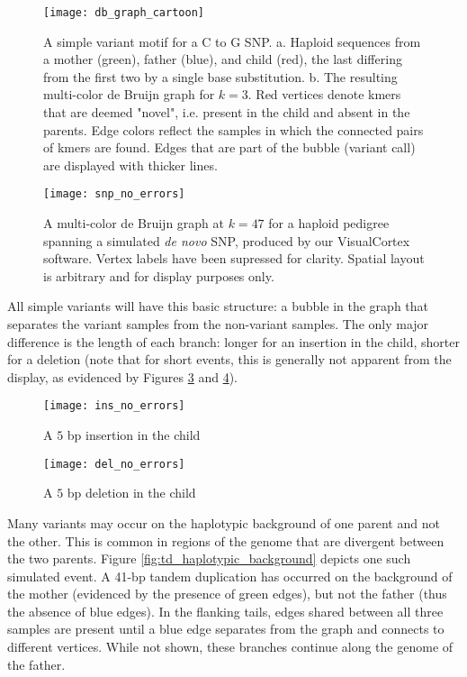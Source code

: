 \begin{figure}[h!]
  \centering
    \texttt{[image: db\_graph\_cartoon]}
  \caption{A simple variant motif for a C to G SNP.  a. Haploid sequences from a mother (green), father (blue), and child (red), the last differing from the first two by a single base substitution.  b. The resulting multi-color de Bruijn graph for $k=3$.  Red vertices denote kmers that are deemed "novel", i.e. present in the child and absent in the parents. Edge colors reflect the samples in which the connected pairs of kmers are found. Edges that are part of the bubble (variant call) are displayed with thicker lines.}
  \label{fig:db_graph_cartoon}
\end{figure}

\begin{figure}[h!]
  \centering
    \texttt{[image: snp\_no\_errors]}
  \caption{A multi-color de Bruijn graph at $k=47$ for a haploid pedigree spanning a simulated \textit{de novo} SNP, produced by our VisualCortex software.  Vertex labels have been supressed for clarity.  Spatial layout is arbitrary and for display purposes only.}
  \label{fig:snp_no_errors}
\end{figure}

All simple variants will have this basic structure: a bubble in the graph that separates the variant samples from the non-variant samples.  The only major difference is the length of each branch: longer for an insertion in the child, shorter for a deletion (note that for short events, this is generally not apparent from the display, as evidenced by Figures \ref{fig:ins_no_errors} and \ref{fig:del_no_errors}).

\begin{figure}[h!]
  \centering
    \texttt{[image: ins\_no\_errors]}
  \caption{A $5$ bp insertion in the child}
  \label{fig:ins_no_errors}
\end{figure}

\begin{figure}[h!]
  \centering
    \texttt{[image: del\_no\_errors]}
  \caption{A $5$ bp deletion in the child}
  \label{fig:del_no_errors}
\end{figure}

Many variants may occur on the haplotypic background of one parent and not the other.  This is common in regions of the genome that are divergent between the two parents.  Figure \ref{fig:td_haplotypic_background} depicts one such simulated event.  A 41-bp tandem duplication has occurred on the background of the mother (evidenced by the presence of green edges), but not the father (thus the absence of blue edges).  In the flanking tails, edges shared between all three samples are present until a blue edge separates from the graph and connects to different vertices.  While not shown, these branches continue along the genome of the father.

